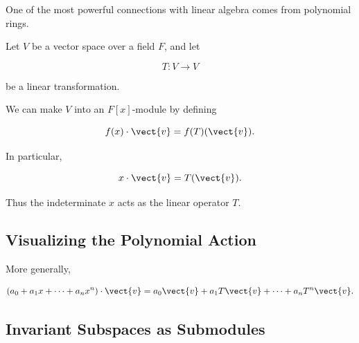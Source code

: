 One of the most powerful connections with linear algebra comes from
polynomial rings.

Let \(V\) be a vector space over a field \(F\), and let

\[ T:V\to V \]

be a linear transformation.

We can make \(V\) into an \(F[x]\)-module by defining

\[ f(x)\cdot\vect{v}=f(T)(\vect{v}). \]

In particular,

\[ x\cdot\vect{v}=T(\vect{v}). \]

Thus the indeterminate \(x\) acts as the linear operator \(T\).

\subsection{Visualizing the Polynomial Action}
\label{subsec:polynomial-module-action-visual}

\begin{center}
\end{center}

More generally,

\[ (a_0+a_1x+\cdots+a_nx^n)\cdot\vect{v}
=a_0\vect{v}+a_1T\vect{v}+\cdots+a_nT^n\vect{v}. \]

\subsection{Invariant Subspaces as Submodules}
\label{subsec:invariant-subspaces-submodules}

